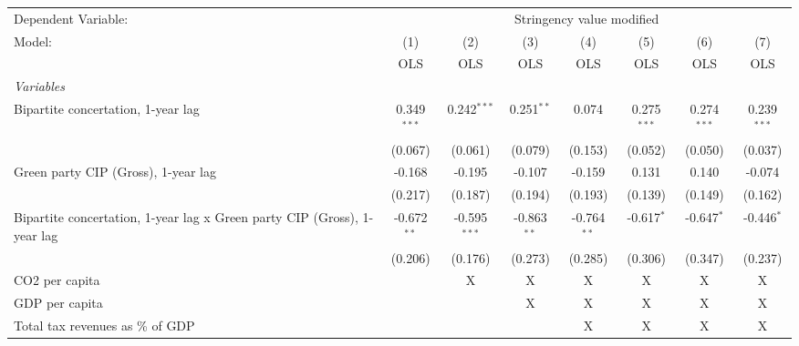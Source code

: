 
\begingroup
\centering
\begin{tabular}{lccccccc}
   \toprule
   Dependent Variable: & \multicolumn{7}{c}{Stringency value modified}\\
   Model:                                                                   & (1)           & (2)            & (3)           & (4)           & (5)           & (6)           & (7)\\  
                                                                            &  OLS          & OLS            & OLS           & OLS           & OLS           & OLS           & OLS\\  
   \midrule
   \emph{Variables}\\
   Bipartite concertation, 1-year lag                                       & 0.349$^{***}$ & 0.242$^{***}$  & 0.251$^{**}$  & 0.074         & 0.275$^{***}$ & 0.274$^{***}$ & 0.239$^{***}$\\   
                                                                            & (0.067)       & (0.061)        & (0.079)       & (0.153)       & (0.052)       & (0.050)       & (0.037)\\   
   Green party CIP (Gross), 1-year lag                                      & -0.168        & -0.195         & -0.107        & -0.159        & 0.131         & 0.140         & -0.074\\   
                                                                            & (0.217)       & (0.187)        & (0.194)       & (0.193)       & (0.139)       & (0.149)       & (0.162)\\   
   Bipartite concertation, 1-year lag x Green party CIP (Gross), 1-year lag & -0.672$^{**}$ & -0.595$^{***}$ & -0.863$^{**}$ & -0.764$^{**}$ & -0.617$^{*}$  & -0.647$^{*}$  & -0.446$^{*}$\\   
                                                                            & (0.206)       & (0.176)        & (0.273)       & (0.285)       & (0.306)       & (0.347)       & (0.237)\\   
   CO2 per capita                                                           &               & X              & X             & X             & X             & X             & X\\  
   GDP per capita                                                           &               &                & X             & X             & X             & X             & X\\  
   Total tax revenues as \% of GDP                                          &               &                &               & X             & X             & X             & X\\  

\end{tabular}
